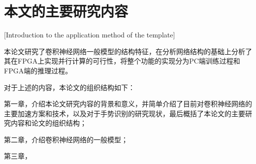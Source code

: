 \section{本文的主要研究内容}[Introduction to the application method of the template]

本论文研究了卷积神经网络一般模型的结构特征，在分析网络结构的基础上分析了其在FPGA上实现并行计算的可行性，将整个功能的实现分为PC端训练过程和FPGA端的推理过程。

对于上述的内容，本论文的组织结构如下：

第一章，介绍本论文研究内容的背景和意义，并简单介绍了目前对卷积神经网络的主要加速方案和技术，以及对于手势识别的研究现状，最后概括了本论文的主要研究内容和论文的组织结构；

第二章，介绍卷积神经网络的一般模型；

第三章，
